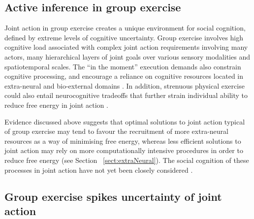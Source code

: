 \begin{CJK}{UTF8}{gbsn}








\section{Active inference in group exercise \label{sect:activeInfGE}}

Joint action in group exercise creates a unique environment for social cognition, defined by extreme levels of cognitive uncertainty.  Group exercise involves high cognitive load associated with complex joint action requirements involving many actors, many hierarchical layers of joint goals over various sensory modalities and spatiotemporal scales. The ``in the moment'' execution demands also constrain cognitive processing, and encourage a reliance on cognitive resources located in extra-neural and bio-external domains \citep{Bourbousson2016}.  In addition, strenuous physical exercise could also entail neurocognitive tradeoffs that further strain individual ability to reduce free energy in joint action \citep{Dietrich2004b}.

Evidence discussed above suggests that optimal solutions to joint action typical of group exercise may tend to favour the recruitment of more extra-neural resources as a way of minimising free energy, whereas less efficient solutions to joint action may rely on more computationally intensive procedures in order to reduce free energy (see Section ~\ref{sect:extraNeural}).  The social cognition of these processes in joint action have not yet been closely considered \citep[but see ][]{Marsh2009,Lumsden2012}.




    \subsection{Group exercise spikes uncertainty of joint action}



\end{CJK}
